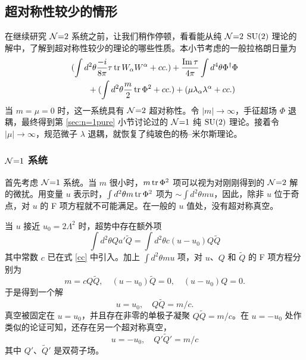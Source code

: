 \subsection{超对称性较少的情形}
在继续研究 $\mathcal{N}{=}2$ 系统之前，让我们稍作停顿，看看能从纯 $\mathcal{N}{=}2$ $\mathop{\mathrm{SU}}(2)$ 理论的解中，了解到超对称性较少的理论的哪些性质。本小节考虑的一般拉格朗日量为
\begin{equation}
\begin{aligned}
&(\int d^2\theta \frac{-i}{8\pi}\tau \mathop{\mathrm{tr}}\nolimits W_\alpha W^\alpha + cc.)
+\frac{\mathop{\mathrm{Im}} \tau}{4\pi}\int d^4\theta \Phi^\dagger \Phi \\
&\qquad +(\int d^2\theta \frac{m}2\mathop{\mathrm{tr}}\nolimits\Phi^2 + cc.)
+(\mu \lambda_\alpha\lambda^\alpha + cc.)
\end{aligned}\label{441}
\end{equation}
当 $m=\mu=0$ 时，这一系统具有 $\mathcal{N}{=}2$ 超对称性。令 $|m|\to\infty$，手征超场 $\Phi$ 退耦，最终得到第 \ref{sec:n=1pure} 小节讨论过的 $\mathcal{N}{=}1$ 纯 $\mathop{\mathrm{SU}}(2)$ 理论。接着令 $|\mu|\to\infty$，规范微子 $\lambda$ 退耦，就恢复了纯玻色的杨--米尔斯理论。

\subsubsection{$\mathcal{N}{=}1$ 系统}
首先考虑 $\mathcal{N}{=}1$ 系统。当 $m$ 很小时，$m\mathop{\mathrm{tr}}\nolimits\Phi^2$ 项可以视为对刚刚得到的 $\mathcal{N}{=}2$ 解的微扰。用变量 $u$ 表示时，$\int d^2\theta m\mathop{\mathrm{tr}}\nolimits\Phi^2$ 项为 $\sim\int d^2\theta mu$，因此，除非 $u$ 位于奇点，对 $u$ 的 F 项方程就不可能满足。在一般的 $u$ 值处，没有超对称真空。

当 $u$ 接近 $u_0=2\Lambda^2$ 时，超势中存在额外项
\begin{equation}
\int d^2\theta Qa'\tilde Q = \int d^2\theta c(u-u_0)Q\tilde Q
\end{equation}
其中常数 $c$ 已在式 \eqref{cc} 中引入。加上 $\int d^2\theta mu$ 项，对 $u$、$Q$ 和 $\tilde Q$ 的 F 项方程分别为
\begin{equation}
m=cQ\tilde Q,\quad
(u-u_0)\tilde Q=0,\quad
(u-u_0)Q=0.
\end{equation}
于是得到一个解
\begin{equation}
u=u_0,\quad Q\tilde Q=m/c.
\end{equation}
真空被固定在 $u=u_0$，并且存在非零的单极子凝聚 $Q\tilde Q=m/c$。在 $u=-u_0$ 处作类似的论证可知，还存在另一个超对称真空，
\begin{equation}
u=-u_0,\quad Q'\tilde Q'=m/c
\end{equation}
其中 $Q'$、$\tilde Q'$ 是双荷子场。

